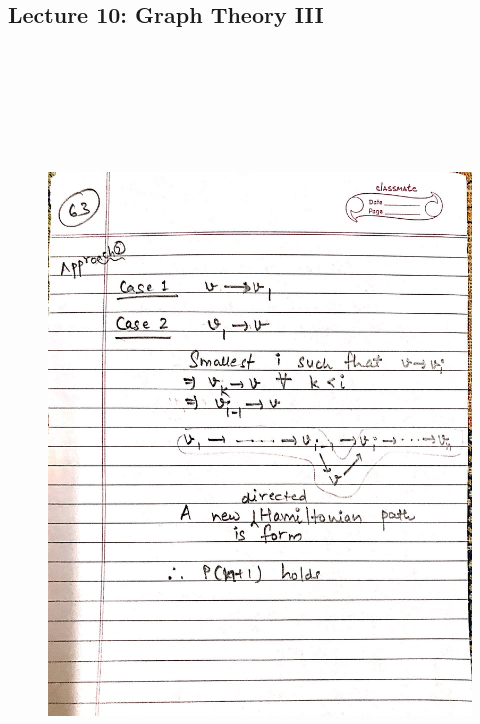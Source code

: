 \newpage
{\color{black} \subsection*{Lecture 10: Graph Theory III}}
\begin{figure}[H]
    \centering
    \includegraphics[width=16cm, height=21cm]{"./MIT-6.042J/MIT-6042J-063"}
\end{figure}

